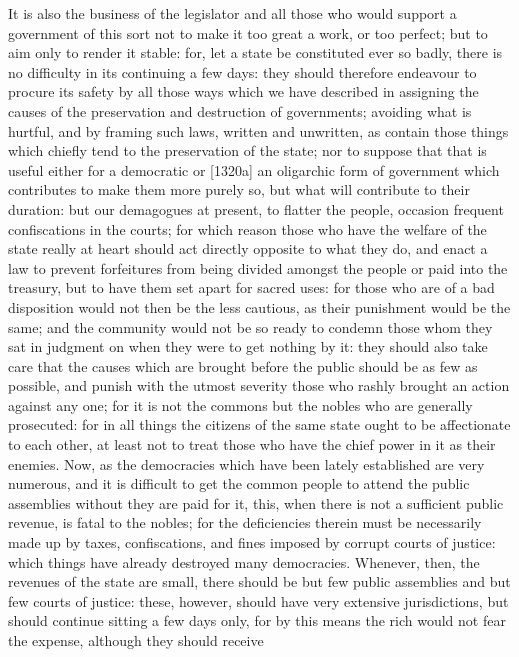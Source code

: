 It is also the business of the legislator and all those who would support
a government of this sort not to make it too great a work, or too perfect;
but to aim only to render it stable: for, let a state be constituted ever
so badly, there is no difficulty in its continuing a few days: they should
therefore endeavour to procure its safety by all those ways which we have
described in assigning the causes of the preservation and destruction of
governments; avoiding what is hurtful, and by framing such laws, written
and unwritten, as contain those things which chiefly tend to the
preservation of the state; nor to suppose that that is useful either for a
democratic or [1320a] an oligarchic form of government which contributes
to make them more purely so, but what will contribute to their duration:
but our demagogues at present, to flatter the people, occasion frequent
confiscations in the courts; for which reason those who have the welfare
of the state really at heart should act directly opposite to what they do,
and enact a law to prevent forfeitures from being divided amongst the
people or paid into the treasury, but to have them set apart for sacred
uses: for those who are of a bad disposition would not then be the less
cautious, as their punishment would be the same; and the community would
not be so ready to condemn those whom they sat in judgment on when they
were to get nothing by it: they should also take care that the causes
which are brought before the public should be as few as possible, and
punish with the utmost severity those who rashly brought an action against
any one; for it is not the commons but the nobles who are generally
prosecuted: for in all things the citizens of the same state ought to be
affectionate to each other, at least not to treat those who have the chief
power in it as their enemies. Now, as the democracies which have been
lately established are very numerous, and it is difficult to get the
common people to attend the public assemblies without they are paid for
it, this, when there is not a sufficient public revenue, is fatal to the
nobles; for the deficiencies therein must be necessarily made up by taxes,
confiscations, and fines imposed by corrupt courts of justice: which
things have already destroyed many democracies. Whenever, then, the
revenues of the state are small, there should be but few public assemblies
and but few courts of justice: these, however, should have very extensive
jurisdictions, but should continue sitting a few days only, for by this
means the rich would not fear the expense, although they should receive
